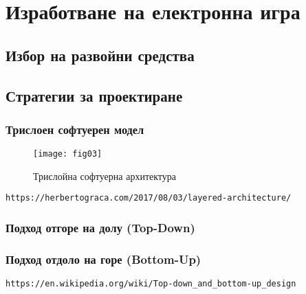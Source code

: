 ﻿\newpage
\chapter{Изработване на електронна игра}
\label{chapter02}

\section{Избор на развойни средства}

\section{Стратегии за проектиране}

\subsection{Трислоен софтуерен модел}

\begin{figure}[h!]
 \centering
 \texttt{[image: fig03]}
 \caption{Трислойна софтуерна архитектура}
\label{figure03}
\end{figure}
\FloatBarrier

\begin{lstlisting}
https://herbertograca.com/2017/08/03/layered-architecture/
\end{lstlisting}

\subsection{Подход отгоре на долу (Top-Down)}

\subsection{Подход отдоло на горе (Bottom-Up)}

\begin{lstlisting}
https://en.wikipedia.org/wiki/Top-down_and_bottom-up_design
\end{lstlisting}

